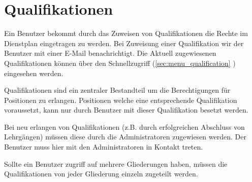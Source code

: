 \chapter{Qualifikationen}
\label{cha:qualification}
Ein Benutzer bekommt durch das Zuweisen von Qualifikationen die Rechte im Dienstplan eingetragen zu werden. Bei Zuweisung einer Qualifikation wir der Benutzer mit einer E-Mail benachrichtigt. Die Aktuell zugewiesenen Qualifikationen können über den Schnellzugriff (\ref{sec:menu_qualification} \textit{}) eingesehen werden.

\noindent Qualifikationen sind ein zentraler Bestandteil um die Berechtigungen für Positionen zu erlangen. Positionen welche eine entsprechende Qualifikation voraussetzt, kann nur durch Benutzer mit dieser Qualifikation besetzt werden.

\noindent Bei neu erlangen von Qualifikationen (z.B. durch erfolgreichen Abschluss von Lehrgängen) müssen diese durch die Administratoren zugewiesen werden. Der Benutzer muss hier mit den Administratoren in Kontakt treten.

\vspace*{5mm} \noindent Sollte ein Benutzer zugriff auf mehrere Gliederungen haben, müssen die Qualifikationen von jeder Gliederung einzeln zugeteilt werden.